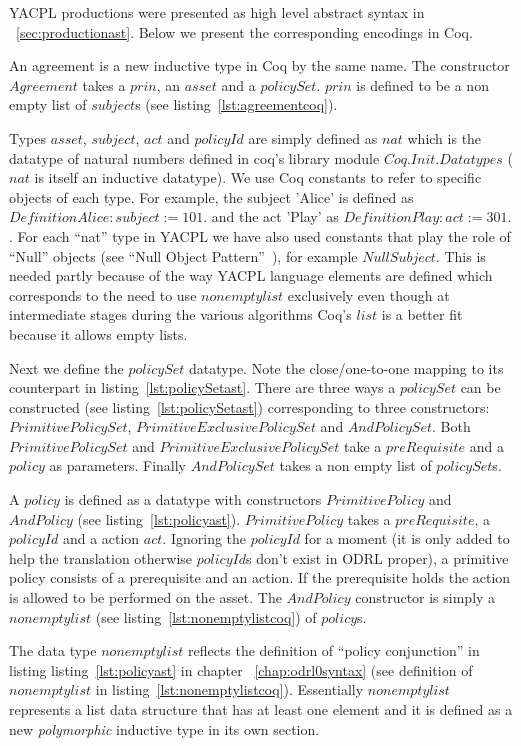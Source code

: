 YACPL productions were presented as high level abstract syntax in ~\ref{sec:productionast}. Below we present the corresponding encodings in Coq. 

An agreement is a new inductive type in Coq by the same name. The constructor $Agreement$ takes a $prin$, an $asset$ and a $policySet$. $prin$ is defined to be a non empty list of $subject$s (see listing~\ref{lst:agreementcoq}). 

Types $asset$, $subject$, $act$ and $policyId$ are simply defined as $nat$ which is the datatype of natural numbers defined in coq's library module $Coq.Init.Datatypes$ ($nat$ is itself an inductive datatype). We use Coq constants to refer to specific objects of each type. For example, the subject 'Alice' is defined as $Definition Alice:subject := 101.$ and the act 'Play' as $Definition Play : act := 301.$. For each ``nat'' type in YACPL we have also used constants that play the role of ``Null'' objects (see ``Null Object Pattern''~\cite{martin1998pattern}), for example $NullSubject$. This is needed partly because of the way YACPL language elements are defined which corresponds to the need to use $nonemptylist$ exclusively even though at intermediate stages during the various algorithms Coq's $list$ is a better fit because it allows empty lists.

Next we define the $policySet$ datatype. Note the close/one-to-one mapping to its counterpart in listing~\ref{lst:policySetast}. There are three ways a $policySet$ can be constructed (see listing~\ref{lst:policySetast}) corresponding to three constructors: $PrimitivePolicySet$, $PrimitiveExclusivePolicySet$ and $AndPolicySet$. Both $PrimitivePolicySet$ and $PrimitiveExclusivePolicySet$ take a $preRequisite$ and a $policy$ as parameters. Finally $AndPolicySet$ takes a non empty list of $policySet$s.

A $policy$ is defined as a datatype with constructors $PrimitivePolicy$ and $AndPolicy$ (see listing~\ref{lst:policyast}). $PrimitivePolicy$ takes a $preRequisite$, a $policyId$ and a action $act$. Ignoring the $policyId$ for a moment (it is only added to help the translation otherwise $policyId$s don't exist in ODRL proper), a primitive policy consists of a prerequisite and an action. If the prerequisite holds the action is allowed to be performed on the asset. The $AndPolicy$ constructor is simply a $nonemptylist$ (see listing~\ref{lst:nonemptylistcoq}) of $policy$s. 

The data type $nonemptylist$ reflects the definition of ``policy conjunction'' in listing listing~\ref{lst:policyast} in chapter ~\ref{chap:odrl0syntax} (see definition of $nonemptylist$ in listing~\ref{lst:nonemptylistcoq}). Essentially $nonemptylist$ represents a list data structure that has at least one element and it is defined as a new \emph{polymorphic} inductive type in its own section. 

